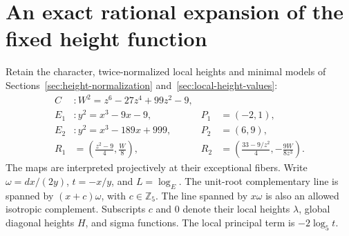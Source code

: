 \section{An exact rational expansion of the fixed height function}
\label{zs-section}

Retain the character, twice-normalized local heights and minimal models
of Sections~\ref{sec:height-normalization} and~\ref{sec:local-height-values}:
\begin{align}
 C&:W^2=z^6-27z^4+99z^2-9,\\
 E_1&:y^2=x^3-9x-9,&P_1&=(-2,1),\\
 E_2&:y^2=x^3-189x+999,&P_2&=(6,9),\\
 R_1&=\left(\frac{z^2-9}{4},\frac W8\right),&
 R_2&=\left(\frac{33-9/z^2}{4},-\frac{9W}{8z^3}\right).
 \label{zs-models}
\end{align}
The maps are interpreted projectively at their exceptional fibers.
Write \(\omega=dx/(2y)\), \(t=-x/y\), and \(L=\log_E\).
The unit-root complementary line is spanned by \((x+c)\omega\),
with \(c\in\mathbb Z_5\). The line spanned by \(x\omega\) is also an
allowed isotropic complement. Subscripts \(c\) and \(0\) denote their
local heights \(\lambda\), global diagonal heights \(H\), and sigma
functions. The local principal term is \(-2\log_5t\).

